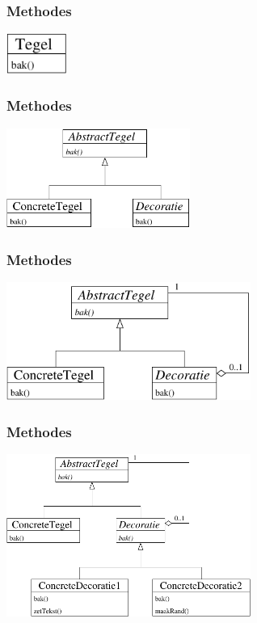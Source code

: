 \documentclass{beamer}
\begin{document}
\begin{frame}
\frametitle{Methodes}
\begin{center}
\includegraphics[width=2cm]{model5}
\end{center}
\end{frame}

\begin{frame}
\frametitle{Methodes}
\begin{center}
\includegraphics[width=6cm]{model6}
\end{center}
\end{frame}

\begin{frame}
\frametitle{Methodes}
\begin{center}
\includegraphics[width=8cm]{model7}
\end{center}
\end{frame}

\begin{frame}
\frametitle{Methodes}
\begin{center}
\includegraphics[width=8cm]{model8}
\end{center}
\end{frame}
\end{document}
